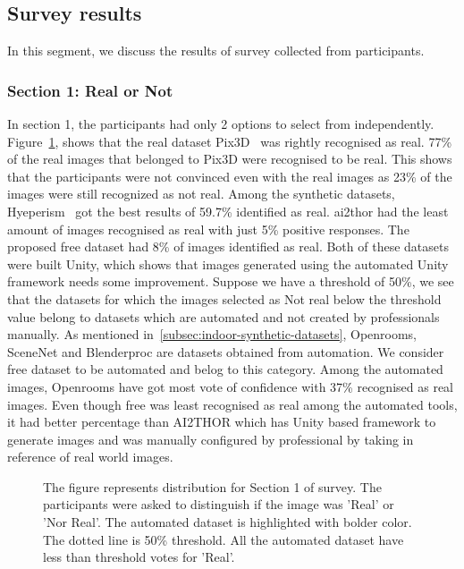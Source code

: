\subsection{Survey results}\label{subsec:survey-results}
In this segment, we discuss the results of survey collected from participants.

\subsubsection{Section 1: Real or Not}
In section 1, the participants had only 2 options to select from independently.
Figure~\ref{fig:question1}, shows that the real dataset Pix3D~\cite{pix3d} was rightly recognised as real.
77\% of the real images that belonged to Pix3D were recognised to be real.
This shows that the participants were not convinced even with the real images as 23\% of the images were still recognized as not real.
Among the synthetic datasets, Hyeperism~\cite{Roberts2020HypersimAP} got the best results of 59.7\% identified as real.
\gls{ai2thor} had the least amount of images recognised as real with just 5\% positive responses.
The proposed \gls{free} dataset had 8\% of images identified as real.
Both of these datasets were built Unity, which shows that images generated using the automated Unity framework needs some improvement.
Suppose we have a threshold of 50\%, we see that the datasets for which the images selected as Not real below the threshold value belong to datasets which are automated and not created by professionals manually.
As mentioned in~\ref{subsec:indoor-synthetic-datasets}, Openrooms, SceneNet and Blenderproc are datasets obtained from automation.
We consider \gls{free} dataset to be automated and belog to this category.
Among the automated images, Openrooms have got most vote of confidence with 37\% recognised as real images.
Even though \gls{free} was least recognised as real among the automated tools, it had better percentage than AI2THOR which has Unity based framework to generate images and was manually configured by professional by taking in reference of real world images.

\begin{figure}
    \centering
    \resizebox{\textwidth}{!}{}
    \caption{The figure represents distribution for Section 1 of survey. The participants were asked to distinguish if the image was 'Real' or 'Nor Real'.
    The automated dataset is highlighted with bolder color. The dotted line is 50\% threshold. All the automated dataset have less than threshold votes for 'Real'.}
    \label{fig:question1}
\end{figure}

